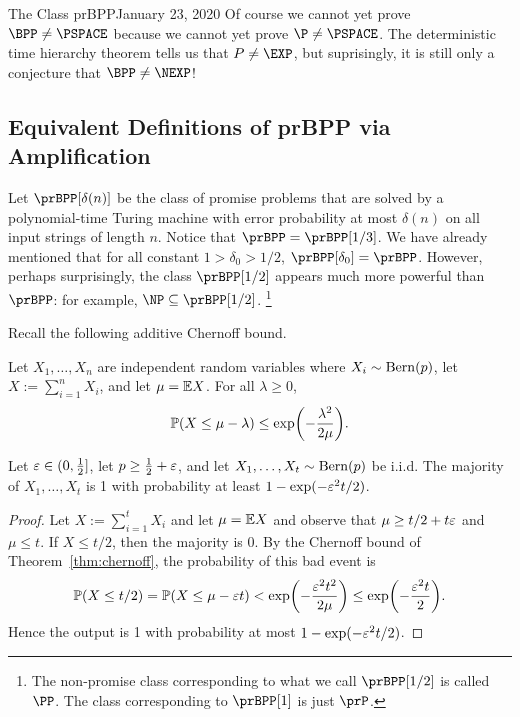 \begin{lecture}{1}{The Class prBPP}{January 23, 2020}
Of course we cannot yet prove $\BPP \ne \PSPACE$ because we cannot yet prove
$\P \ne \PSPACE$. The deterministic time hierarchy theorem tells us that $P \ne
\EXP$, but suprisingly, it is still only a conjecture that $\BPP \ne \NEXP$!

\subsection{Equivalent Definitions of prBPP via Amplification}

Let $\prBPP[\delta(n)]$ be the class of promise problems that are solved by a
polynomial-time Turing machine with error probability at most $\delta(n)$ on
all input strings of length $n$. Notice that $\prBPP = \prBPP[1/3]$. We have
already mentioned that for all constant $1> \delta_0 > 1/2$, $\prBPP[\delta_0] =
\prBPP$. However, perhaps surprisingly, the class $\prBPP[1/2]$ appears much
more powerful than $\prBPP$: for example, $\NP \subseteq \prBPP[1/2]$.%
\footnote{The non-promise class corresponding to what we call $\prBPP[1/2]$ is
called $\PP$. The class corresponding to $\prBPP[1]$ is just $\prP$.}

Recall the following additive Chernoff bound.

\begin{theorem}\label{thm:chernoff}
  Let $X_1, \dots, X_n$ are independent random variables where $X_i \sim
  \operatorname{Bern}(p)$, let $X := \sum_{i=1}^n X_i$, and let $\mu = \mathbb{E} X$. For all
  $\lambda \ge 0$, \[
    \Pr\paren*{X \le \mu - \lambda} \le \exp\paren*{-\frac{\lambda^2}{2\mu}}.
  \]
\end{theorem}

\begin{proposition}\label{prop:maj}
  Let $\varepsilon \in (0, \frac{1}{2}]$, let $p \ge \frac{1}{2} + \varepsilon$, and let $X_1,
  \dots, X_t \sim \operatorname{Bern}(p)$ be i.i.d. The majority of $X_1, \dots, X_t$ is 1
  with probability at least $1 - \exp(-\varepsilon^2 t/2)$.
\end{proposition}

\begin{proof}
  Let $X := \sum_{i=1}^t X_i$ and let $\mu = \mathbb{E} X$ and observe that $\mu \ge
  t/2 + t\varepsilon$ and $\mu \le t$. If $X \le t/2$, then the majority is 0. By the
  Chernoff bound of Theorem~\ref{thm:chernoff}, the probability of this bad
  event is \[
    \Pr(X \le t/2) = \Pr(X \le \mu - \eps t) < \exp\paren*{-\frac{\eps^2t^2}{2\mu}} \le \exp\paren*{-\frac{\eps^2t}{2}}.
  \]
  Hence the output is 1 with probability at most $1 - \exp(-\varepsilon^2 t/2)$.
\end{proof}


\end{lecture}
